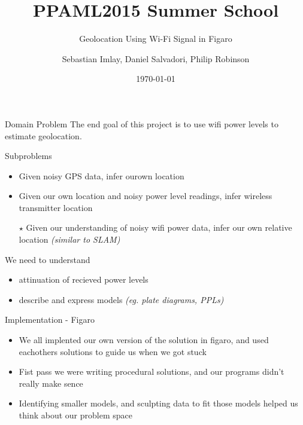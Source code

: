 \documentclass[11pt]{beamer}
\begin{document}
\title{PPAML2015 Summer School}

\subtitle{Geolocation Using Wi-Fi Signal in Figaro}

\author{Sebastian Imlay, Daniel Salvadori, Philip Robinson}


\date{\today}

\begin{frame}
  \titlepage
\end{frame}


\begin{frame}{Domain Problem}
The end goal of this project is to use wifi power levels to estimate geolocation.

Subproblems
\begin{itemize}
\item Given noisy GPS data, infer ourown location
\item Given our own location and noisy power level readings, infer wireless transmitter location
\item[$\star$] Given our understanding of noisy wifi power data, infer our own relative location {\em (similar to SLAM)}
\end{itemize}
We need to understand
\begin{itemize}
\item attinuation of recieved power levels
\item describe and express models {\em (eg. plate diagrams, PPLs)}
\end{itemize}
\end{frame}

\begin{frame}{Implementation - Figaro}
\begin{multicols}{2}
\resizebox{!}{1.5in}{
}
\columnbreak

\begin{itemize}
\item We all implented our own version of the solution in figaro, and used eachothers solutions to guide us when we got stuck
\item Fist pass we were writing procedural solutions, and our programs didn't really make sence
\item Identifying smaller models, and sculpting data to fit those models helped us think about our problem space
\end{itemize}
\end{multicols}

\end{frame}
\end{document}
